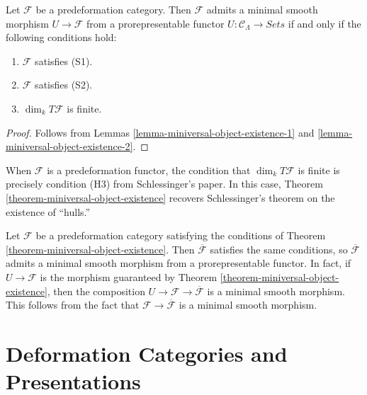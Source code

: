 \begin{theorem}
\label{theorem-miniversal-object-existence}
Let $\mathcal{F}$ be a predeformation category.  Then $\mathcal{F}$ admits a 
minimal smooth morphism $U \to \mathcal{F}$ from a prorepresentable 
functor $U: \mathcal{C}_\Lambda \to \textit{Sets}$ if and only 
if the following conditions hold:
\begin{enumerate}
\item $\mathcal{F}$ satisfies (S1).
\item $\mathcal{F}$ satisfies (S2).
\item $\dim_{k} T\mathcal{F}$ is finite.
\end{enumerate}
\end{theorem}

\begin{proof}
Follows from Lemmas \ref{lemma-miniversal-object-existence-1} and 
\ref{lemma-miniversal-object-existence-2}.
\end{proof}

\begin{remark}
\label{remark-compare-schlessinger-H3}
When $\mathcal{F}$ is a predeformation functor, the condition that $\dim_{k} 
T\mathcal{F}$ is finite is precisely condition (H3) from Schlessinger's paper. 
In this case, Theorem \ref{theorem-miniversal-object-existence} recovers 
Schlessinger's theorem on the existence of ``hulls.''
\end{remark}

\begin{remark}
\label{remark-compose-minimal-into-iso-classes}
Let $\mathcal{F}$ be a predeformation category satisfying the conditions of 
Theorem \ref{theorem-miniversal-object-existence}. Then $\overline{\mathcal{F}}$ 
satisfies the same conditions, so $\mathcal \overline{\mathcal{F}}$ admits a 
minimal smooth morphism from a prorepresentable functor.  In fact, if $U 
\to \mathcal{F}$ is the morphism guaranteed by Theorem 
\ref{theorem-miniversal-object-existence}, then the composition $U \to 
\mathcal{F} \to \overline{\mathcal{F}}$ is a minimal smooth morphism.  
This follows from the fact that $\mathcal{F} \to \overline{\mathcal{F}}$ 
is a minimal smooth morphism.
\end{remark}


\section{Deformation Categories and Presentations}
\label{section-deformation-groupoids-presentations}

